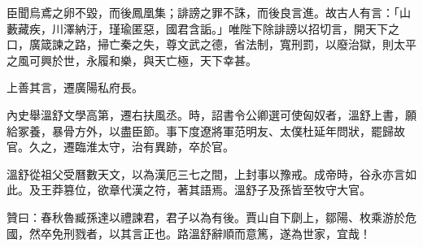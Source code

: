 \begin{pinyinscope}
臣聞烏鳶之卵不毀，而後鳳凰集；誹謗之罪不誅，而後良言進。故古人有言：「山藪藏疾，川澤納汙，瑾瑜匿惡，國君含詬。」唯陛下除誹謗以招切言，開天下之口，廣箴諫之路，掃亡秦之失，尊文武之德，省法制，寬刑罰，以廢治獄，則太平之風可興於世，永履和樂，與天亡極，天下幸甚。

上善其言，遷廣陽私府長。

內史舉溫舒文學高第，遷右扶風丞。時，詔書令公卿選可使匈奴者，溫舒上書，願給冢養，暴骨方外，以盡臣節。事下度遼將軍范明友、太僕杜延年問狀，罷歸故官。久之，遷臨淮太守，治有異跡，卒於官。

溫舒從祖父受曆數天文，以為漢厄三七之間，上封事以豫戒。成帝時，谷永亦言如此。及王莽篡位，欲章代漢之符，著其語焉。溫舒子及孫皆至牧守大官。

贊曰：春秋魯臧孫達以禮諫君，君子以為有後。賈山自下劘上，鄒陽、枚乘游於危國，然卒免刑戮者，以其言正也。路溫舒辭順而意篤，遂為世家，宜哉！


\end{pinyinscope}